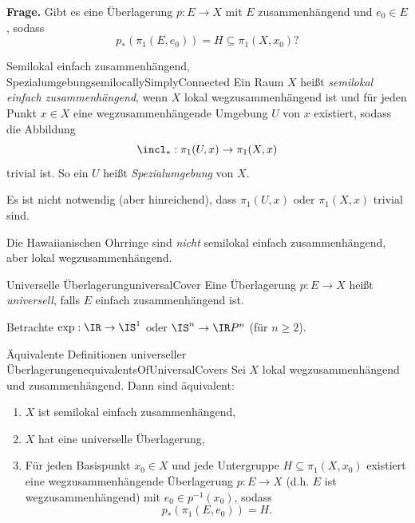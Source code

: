 \documentclass[language=ngerman]{TemplateLecture} %
\begin{document}
\textbf{Frage.} Gibt es eine Überlagerung $p: E \to X$ mit $E$ zusammenhängend und $e_0 \in E$, sodass 
\begin{equation*}
    p_*(\pi_1(E,e_0)) = H \subseteq \pi_1(X, x_0)?
\end{equation*}

\begin{defi}{Semilokal einfach zusammenhängend, Spezialumgebung}{semilocallySimplyConnected}
    Ein Raum $X$ heißt \emph{semilokal einfach zusammenhängend}, wenn $X$ lokal wegzusammenhängend ist und für jeden Punkt $x \in X$ eine wegzusammenhängende Umgebung $U$ von $x$ existiert, sodass die Abbildung 
    \begin{equation*}
        \incl_*: \pi_1(U,x) \to \pi_1(X,x)
    \end{equation*}
    trivial ist. So ein $U$ heißt \emph{Spezialumgebung} von $X$.
\end{defi}
\begin{remark}
    Es ist nicht notwendig (aber hinreichend), dass $\pi_1(U,x)$ oder $\pi_1(X,x)$ trivial sind.
\end{remark}
\begin{example}
    Die Hawaiianischen Ohrringe sind \emph{nicht} semilokal einfach zusammenhängend, aber lokal wegzusammenhängend.
\end{example}

\begin{defi}{Universelle Überlagerung}{universalCover}
    Eine Überlagerung $p: E \to X$ heißt \emph{universell}, falls $E$ einfach zusammenhängend ist.
\end{defi}
\begin{example}
    Betrachte $\exp: \IR \to \IS^1$ oder $\IS^n \to \IR P^n$ (für $n \geq 2$).  
\end{example}

\begin{thm}{Äquivalente Definitionen universeller Überlagerungen}{equivalentsOfUniversalCovers}
    Sei $X$ lokal wegzusammenhängend und zusammenhängend. Dann sind äquivalent:
    \begin{enumerate}[$(i)$]
        \item $X$ ist semilokal einfach zusammenhängend,
        \item $X$ hat eine universelle Überlagerung,
        \item Für jeden Basispunkt $x_0 \in X$ und jede Untergruppe $H \subseteq \pi_1(X, x_0)$ existiert eine wegzusammenhängende Überlagerung $p: E \to X$ (d.h. $E$ ist wegzusammenhängend) mit $e_0 \in p^{-1}(x_0)$, sodass 
        \begin{equation*}
            p_*(\pi_1(E, e_0)) = H.
        \end{equation*}
    \end{enumerate}
\end{thm}
\end{document}
